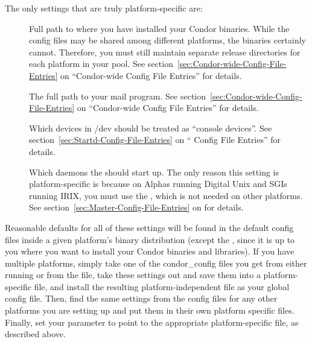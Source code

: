 The only settings that are truly platform-specific are:

\begin{description}

\item[] Full path to where you have installed your
  Condor binaries.  While the config files may be shared among
  different platforms, the binaries certainly cannot.  Therefore, you
  must still maintain separate release directories for each platform
  in your pool.  See section~\ref{sec:Condor-wide-Config-File-Entries}
  on ``Condor-wide Config File Entries'' for details.

\item[] The full path to your mail program.  See
  section~\ref{sec:Condor-wide-Config-File-Entries} on ``Condor-wide
  Config File Entries'' for details.

\item[] Which devices in /dev should be
  treated as ``console devices''.  See
  section~\ref{sec:Startd-Config-File-Entries} on ``
  Config File Entries'' for details.

\item[] Which daemons the  should
  start up.  The only reason this setting is platform-specific is
  because on Alphas running Digital Unix and SGIs running IRIX, you
  must use the , which is not needed on other platforms.
  See section~\ref{sec:Master-Config-File-Entries} on
  for details.

\end{description}

Reasonable defaults for all of these settings will be found in the
default config files inside a given platform's binary distribution
(except the , since it is up to you where you want
to install your Condor binaries and libraries).  If you have multiple
platforms, simply take one of the condor\_config files you get from
either running  or from the
 file, take these settings
out and save them into a platform-specific file, and install the
resulting platform-independent file as your global config file.  Then,
find the same settings from the config files for any other platforms
you are setting up and put them in their own platform specific files.
Finally, set your  parameter to point to
the appropriate platform-specific file, as described above.

